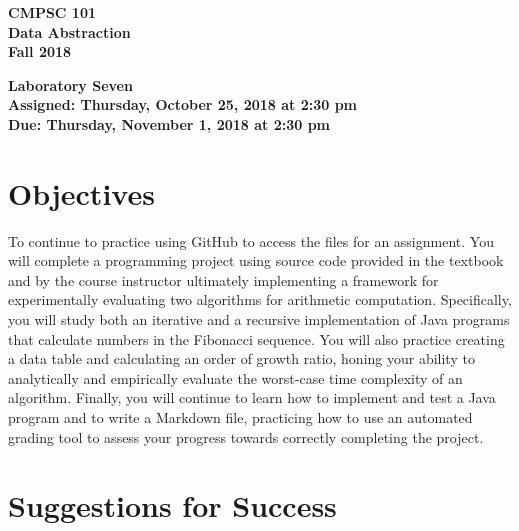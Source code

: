 \documentclass[11pt]{article}
\newcommand{\assignmentduedate}{November 1}
\newcommand{\assignmentassignedate}{October 25}
\newcommand{\assignmentnumber}{Seven}
\newcommand{\labyear}{2018}
\newcommand{\labday}{Thursday}
\newcommand{\labtime}{2:30 pm}
\newcommand{\assigneddate}{Assigned: \labday, \assignmentassignedate, \labyear{} at \labtime{}}
\newcommand{\duedate}{Due: \labday, \assignmentduedate, \labyear{} at \labtime{}}
\newcommand{\labtitle}[1]
{
  \begin{center}
    \begin{center}
      \bf
      CMPSC 101\\Data Abstraction\\
      Fall 2018\\
      \medskip
    \end{center}
    \bf
    #1
  \end{center}
}
\begin{document}
\thispagestyle{empty}

\labtitle{Laboratory \assignmentnumber{} \\ \assigneddate{} \\ \duedate{}}

\section*{Objectives}

To continue to practice using GitHub to access the files for an assignment. You
will complete a programming project using source code provided in the textbook
and by the course instructor ultimately implementing a framework for
experimentally evaluating two algorithms for arithmetic computation.
Specifically, you will study both an iterative and a recursive implementation of
Java programs that calculate numbers in the Fibonacci sequence. You will also
practice creating a data table and calculating an order of growth ratio, honing
your ability to analytically and empirically evaluate the worst-case time
complexity of an algorithm. Finally, you will continue to learn how to implement
and test a Java program and to write a Markdown file, practicing how to use an
automated grading tool to assess your progress towards correctly completing the
project.

\section*{Suggestions for Success}
\end{document}
